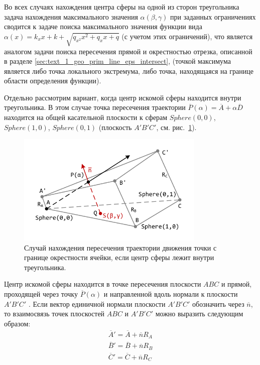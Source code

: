 Во всех случаях нахождения центра сферы на одной из сторон треугольника задача нахождения максимального значения $\alpha(\beta, \gamma)$ при заданных ограничениях сводится к задаче поиска максимального значения функции вида $\alpha(x) = k_x x + k + \sqrt{q_{x^2} x^2 + q_x x + q}$ (с учетом этих ограничений), что является аналогом задачи поиска пересечения прямой и окрестностью отрезка, описанной в разделе \ref{sec:text_1_geo_prim_line_eps_intersect}, (точкой максимума является либо точка локального экстремума, либо точка, находящаяся на границе области определения функции).

Отдельно рассмотрим вариант, когда центр искомой сферы находится внутри треугольника.
В этом случае точка пересечения траектории $\overline{P}(\alpha) = \overline{A} + \alpha \overline{D}$ находится на общей касательной плоскости к сферам $Sphere(0,0)$, $Sphere(1,0)$, $Sphere(0,1)$ (плоскость $A'B'C'$, см. рис.~\ref{fig:text_1_remesh_common_envelope_3}).

\begin{figure}[ht]
\centering
\includegraphics[width=0.80\textwidth]{./pics/text_1_remesh_common_envelope/case1.pdf}
\singlespacing
{}\caption{Случай нахождения пересечения траектории движения точки с границе окрестности ячейки, если центр сферы лежит внутри треугольника.}
\label{fig:text_1_remesh_common_envelope_3}
\end{figure}

Центр искомой сферы находится в точке пересечения плоскости $ABC$ и прямой, проходящей через точку $\overline{P}(\alpha)$ и направленной вдоль нормали к плоскости $A'B'C'$ .
Если вектор единичной нормали плоскости $A'B'C'$ обозначить через $\overline{n}$, то взаимосвязь точек плоскостей $ABC$ и $A'B'C'$ можно выразить следующим образом:
\begin{equation}
	\begin{aligned}
		\overline{A}' = \overline{A} + \overline{n}R_A \\
		\overline{B}' = \overline{B} + \overline{n}R_B \\
		\overline{C}' = \overline{C} + \overline{n}R_C
	\end{aligned}
\end{equation}

